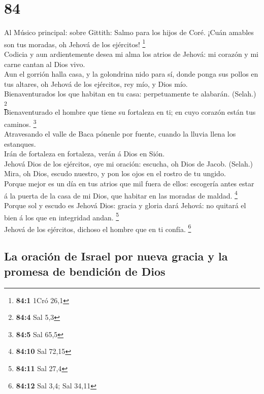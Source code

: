 \hypertarget{section-83}{%
\section{84}\label{section-83}}

 Al Músico principal: sobre Gittith: Salmo para los hijos de
Coré. ¡Cuán amables son tus moradas, oh Jehová de los ejércitos!
\footnote{\textbf{84:1} 1Cró 26,1}\\
 Codicia y aun ardientemente desea mi alma los atrios de
Jehová: mi corazón y mi carne cantan al Dios vivo.\\
 Aun el gorrión halla casa, y la golondrina nido para sí,
donde ponga sus pollos en tus altares, oh Jehová de los ejércitos, rey
mío, y Dios mío.\\
 Bienaventurados los que habitan en tu casa: perpetuamente
te alabarán. (Selah.) \footnote{\textbf{84:4} Sal 5,3}\\
 Bienaventurado el hombre que tiene su fortaleza en ti; en
cuyo corazón están tus caminos. \footnote{\textbf{84:5} Sal 65,5}\\
 Atravesando el valle de Baca pónenle por fuente, cuando la
lluvia llena los estanques.\\
 Irán de fortaleza en fortaleza, verán á Dios en Sión.\\
 Jehová Dios de los ejércitos, oye mi oración: escucha, oh
Dios de Jacob. (Selah.)\\
 Mira, oh Dios, escudo nuestro, y pon los ojos en el rostro
de tu ungido.\\
 Porque mejor es un día en tus atrios que mil fuera de
ellos: escogería antes estar á la puerta de la casa de mi Dios, que
habitar en las moradas de maldad. \footnote{\textbf{84:10} Sal 72,15}\\
 Porque sol y escudo es Jehová Dios: gracia y gloria dará
Jehová: no quitará el bien á los que en integridad andan. \footnote{\textbf{84:11}
  Sal 27,4}\\
 Jehová de los ejércitos, dichoso el hombre que en ti
confía. \footnote{\textbf{84:12} Sal 3,4; Sal 34,11}

\hypertarget{la-oraciuxf3n-de-israel-por-nueva-gracia-y-la-promesa-de-bendiciuxf3n-de-dios}{%
\subsection{La oración de Israel por nueva gracia y la promesa de
bendición de
Dios}\label{la-oraciuxf3n-de-israel-por-nueva-gracia-y-la-promesa-de-bendiciuxf3n-de-dios}}

